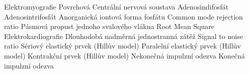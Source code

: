  {Elektromyografie}
 {Povrchová }
 {Centrální nervová soustava}
 {Adenosindifosfát}
 {Adenosintrifosfát}
 {Anorganická iontová forma fosfátu}
 {Common mode rejection ratio}
 {Pásmová propust}
 { jednoho svalového vlákna}
 {Root Mean Square}
 {Elektrokardiografie}
 {Dlouhodobá nadměrná jednostranná zátěž}
 {Signal to noise ratio}
 {Sériový elastický prvek (Hillův model)}
 {Paralelní elastický prvek (Hillův model)}
 {Kontrakční prvek (Hillův model)}
 {Nekonečná impulzní odezva}
 {Konečná impulzní odezva}
